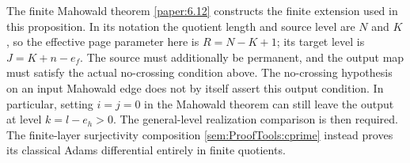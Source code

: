 The finite Mahowald theorem \ref{paper:6.12} constructs the finite
extension used in this proposition. In its notation the quotient
length and source level are $N$ and $K$, so the effective page
parameter here is $R=N-K+1$; its target level is
$J=K+n-e_f$. The source must additionally be permanent, and the
output map must satisfy the actual no-crossing condition above.
The no-crossing hypothesis on an input Mahowald edge does not by
itself assert this output condition. In particular, setting
$i=j=0$ in the Mahowald theorem can still leave the output at
level $k=l-e_h>0$. The general-level realization comparison is
then required. The finite-layer surjectivity composition
\ref{sem:ProofTools:cprime} instead proves its classical Adams
differential entirely in finite quotients.
